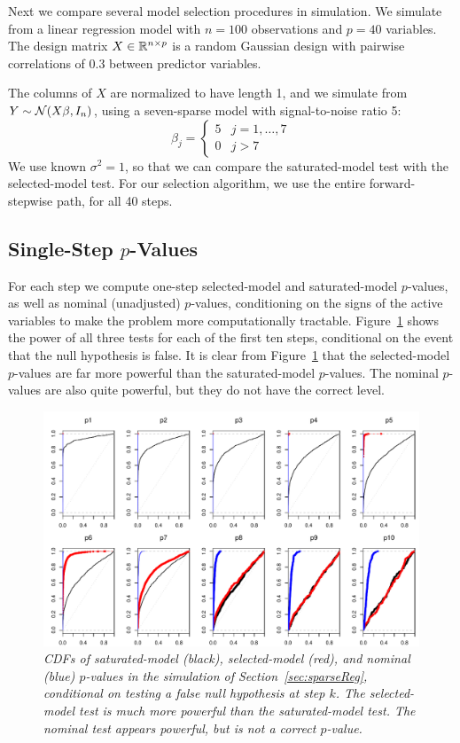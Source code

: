 \documentclass{article}
\begin{document}
Next we compare several model selection procedures in simulation. We simulate from a linear regression model with $n=100$ observations and $p=40$ variables. The design matrix $X\in\mathbb{R}^{n\times p}$ is a random Gaussian design with pairwise correlations of 0.3 between predictor variables.

The columns of $X$ are normalized to have length 1, and we simulate from $Y \sim \mathcal{N}(X\beta,I_n)$, using a seven-sparse model with signal-to-noise ratio 5:
\[
\beta_j = \left\{\begin{matrix}5 & j = 1,\ldots,7\\ 0 &
    j>7\end{matrix}\right.
\]
We use known $\sigma^2=1$, so that we can compare the saturated-model test with the selected-model test. For our selection algorithm, we use the entire forward-stepwise path, for all 40 steps. 

\subsection{Single-Step $p$-Values}

For each step we compute one-step selected-model and saturated-model $p$-values, as well as nominal (unadjusted) $p$-values, conditioning on the signs of the active variables to make the problem more computationally tractable. Figure~\ref{fig:simulation_null_false} shows the power of all three tests for each of the first ten steps, conditional on the event that the null hypothesis is false. It is clear from Figure~\ref{fig:simulation_null_false} that the selected-model $p$-values are far more powerful than the saturated-model $p$-values. The nominal $p$-values are also quite powerful, but they do not have the correct level.

\begin{figure}
  \centering
  \includegraphics[width=.8\textwidth]{figs/simulation_snr_5_alpha_05_null_false.pdf}
  \caption{\em CDFs of saturated-model (black), selected-model (red), and nominal (blue) $p$-values in the simulation of Section~\ref{sec:sparseReg}, conditional on testing a false null hypothesis at step $k$. The selected-model test is much more powerful than the saturated-model test. The nominal test appears powerful, but is not a correct $p$-value.}
  \label{fig:simulation_null_false}
\end{figure}
\end{document}
